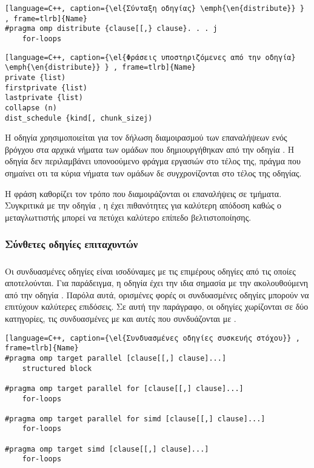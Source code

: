 \begin{lstlisting}[language=C++, caption={\el{Σύνταξη οδηγίας} \emph{\en{distribute}} } , frame=tlrb]{Name}
#pragma omp distribute {clause[[,} clause}. . . j
	for-loops
\end{lstlisting}


\begin{lstlisting}[language=C++, caption={\el{Φράσεις υποστηριζόμενες από την οδηγία} \emph{\en{distribute}} } , frame=tlrb]{Name}
private {list)
firstprivate {list)
lastprivate {list)
collapse (n)
dist_schedule {kind[, chunk_sizej)
\end{lstlisting}

Η οδηγία \emph{} χρησιμοποιείται για τον δήλωση διαμοιρασμού των επαναλήψεων ενός βρόγχου στα αρχικά νήματα των ομάδων που δημιουργήθηκαν από την οδηγία \emph{}. Η οδηγία δεν περιλαμβάνει υπονοούμενο φράγμα εργασιών στο τέλος της, πράγμα που σημαίνει οτι τα κύρια νήματα των ομάδων δε συγχρονίζονται στο τέλος της οδηγίας.

Η φράση \emph{} καθορίζει τον τρόπο που διαμοιράζονται οι επαναλήψεις σε τμήματα. Συγκριτικά με την οδηγία \emph{}, η \emph{} έχει πιθανότητες για καλύτερη απόδοση καθώς ο μεταγλωττιστής μπορεί να πετύχει καλύτερο επίπεδο βελτιστοποίησης.



\subsubsection{Σύνθετες οδηγίες επιταχυντών}
\subparagraph{}

Οι συνδυασμένες οδηγίες είναι ισοδύναμες με τις επιμέρους  οδηγίες από τις οποίες αποτελούνται. Για παράδειγμα, η οδηγία \emph{} έχει την ιδια σημασία με την \emph{} ακολουθούμενη από την οδηγία \emph{}. Παρόλα αυτά, ορισμένες φορές οι συνδυασμένες οδηγίες μπορούν να επιτύχουν καλύτερες επιδόσεις.
Σε αυτή την παράγραφο, οι οδηγίες χωρίζονται σε δύο κατηγορίες, τις συνδυασμένες με \emph{} και αυτές που συνδυάζονται με \emph{}.

\begin{lstlisting}[language=C++, caption={\el{Συνδυασμένες οδηγίες συσκευής στόχου}} , frame=tlrb]{Name}
#pragma omp target parallel [clause[[,] clause]...]
	structured block

#pragma omp target parallel for [clause[[,] clause]...]
	for-loops
	
#pragma omp target parallel for simd [clause[[,] clause]...]
	for-loops
	
#pragma omp target simd [clause[[,] clause]...]
	for-loops
\end{lstlisting}


